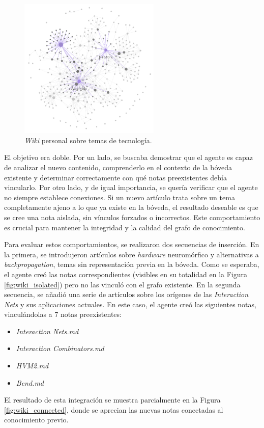 \begin{figure}[h!]
    \centering
    \includegraphics[width=0.6\textwidth]{figures/WikiSamples2.png}
    \caption{\textit{Wiki} personal sobre temas de tecnología.}
    \label{fig:wiki_tech_graph}
\end{figure}

El objetivo era doble. Por un lado, se buscaba demostrar que el agente es capaz de analizar el nuevo contenido, comprenderlo en el contexto de la bóveda existente y determinar correctamente con qué notas preexistentes debía vincularlo. Por otro lado, y de igual importancia, se quería verificar que el agente no siempre establece conexiones. Si un nuevo artículo trata sobre un tema completamente ajeno a lo que ya existe en la bóveda, el resultado deseable es que se cree una nota aislada, sin vínculos forzados o incorrectos. Este comportamiento es crucial para mantener la integridad y la calidad del grafo de conocimiento.

Para evaluar estos comportamientos, se realizaron dos secuencias de inserción. En la primera, se introdujeron artículos sobre \textit{hardware} neuromórfico y alternativas a \textit{backpropagation}, temas sin representación previa en la bóveda. Como se esperaba, el agente creó las notas correspondientes (visibles en su totalidad en la Figura \ref{fig:wiki_isolated}) pero no las vinculó con el grafo existente. En la segunda secuencia, se añadió una serie de artículos sobre los orígenes de las \textit{Interaction Nets} y sus aplicaciones actuales. En este caso, el agente creó las siguientes notas, vinculándolas a 7 notas preexistentes:
\begin{itemize}
    \item \textit{Interaction Nets.md}
    \item \textit{Interaction Combinators.md}
    \item \textit{HVM2.md}
    \item \textit{Bend.md}
\end{itemize}
El resultado de esta integración se muestra parcialmente en la Figura \ref{fig:wiki_connected}, donde se aprecian las nuevas notas conectadas al conocimiento previo.

